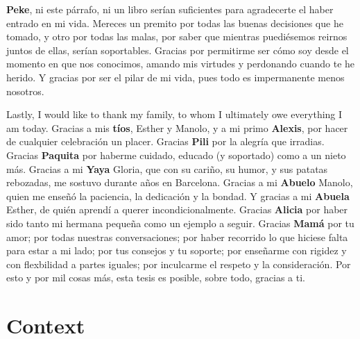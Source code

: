 \documentclass[
  11pt,
]{env/yjiao}
\begin{document}
\textbf{Peke}, ni este párrafo, ni un libro serían suficientes para agradecerte el haber entrado en mi vida. Mereces un premito por todas las buenas decisiones que he tomado, y otro por todas las malas, por saber que mientras puediésemos reirnos juntos de ellas, serían soportables. Gracias por permitirme ser cómo soy desde el momento en que nos conocimos, amando mis virtudes y perdonando cuando te he herido. Y gracias por ser el pilar de mi vida, pues todo es impermanente menos nosotros.

Lastly, I would like to thank my family, to whom I ultimately owe everything I am today. Gracias a mis \textbf{tíos}, Esther y Manolo, y a mi primo \textbf{Alexis}, por hacer de cualquier celebración un placer. Gracias \textbf{Pili} por la alegría que irradias. Gracias \textbf{Paquita} por haberme cuidado, educado (y soportado) como a un nieto más. Gracias a mi \textbf{Yaya} Gloria, que con su cariño, su humor, y sus patatas rebozadas, me sostuvo durante años en Barcelona. Gracias a mi \textbf{Abuelo} Manolo, quien me enseñó la paciencia, la dedicación y la bondad. Y gracias a mi \textbf{Abuela} Esther, de quién aprendí a querer incondicionalmente. Gracias \textbf{Alicia} por haber sido tanto mi hermana pequeña como un ejemplo a seguir. Gracias \textbf{Mamá} por tu amor; por todas nuestras conversaciones; por haber recorrido lo que hiciese falta para estar a mi lado; por tus consejos y tu soporte; por enseñarme con rigidez y con flexbilidad a partes iguales; por inculcarme el respeto y la consideración. Por esto y por mil cosas más, esta tesis es posible, sobre todo, gracias a ti.

\mainmatter

\hypertarget{context}{%
\chapter{Context}\label{context}}
\end{document}

